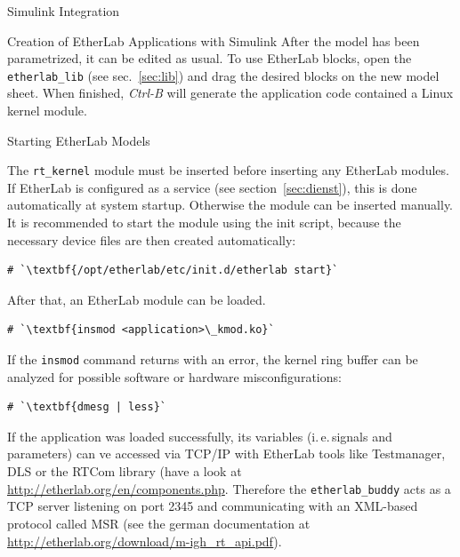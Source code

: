 \begin{ighsec}{Simulink Integration}
\begin{ighsec}{Creation of EtherLab Applications with Simulink}
After the model has been parametrized, it can be edited as usual. To use
EtherLab blocks, open the \texttt{etherlab\_lib} (see sec.~\ref{sec:lib}) and
drag the desired blocks on the new model sheet. When finished, \textit{Ctrl-B}
will generate the application code contained a Linux kernel module.

\end{ighsec}


\end{ighsec} %


\begin{ighsec}{Starting EtherLab Models}
\label{sec:start}

The \texttt{rt\_kernel} module must be inserted before inserting any EtherLab
modules. If EtherLab is configured as a service (see
section~\ref{sec:dienst}), this is done automatically at system startup.
Otherwise the module can be inserted manually. It is recommended to start the
module using the init script, because the necessary device files are then
created automatically:

\begin{lstlisting}[gobble=2]
  # `\textbf{/opt/etherlab/etc/init.d/etherlab start}`
\end{lstlisting}

After that, an EtherLab module can be loaded.

\begin{lstlisting}[gobble=2]
  # `\textbf{insmod <application>\_kmod.ko}`
\end{lstlisting}

If the \texttt{insmod} command returns with an error, the kernel ring
buffer can be analyzed for possible software or hardware
misconfigurations:

\begin{lstlisting}[gobble=2]
  # `\textbf{dmesg | less}`
\end{lstlisting}

If the application was loaded successfully, its variables (i.\,e.\,signals
and parameters) can ve accessed via TCP/IP with EtherLab tools like
Testmanager, DLS or the RTCom library (have a look at
\url{http://etherlab.org/en/components.php}. Therefore the
\texttt{etherlab\_buddy} acts as a TCP server listening on port 2345 and
communicating with an XML-based protocol called MSR (see the german
documentation at \url{http://etherlab.org/download/m-igh_rt_api.pdf}).

\end{ighsec}

